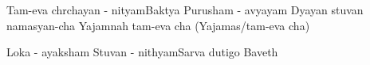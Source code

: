 \documentclass[10pt]{article}
\begin{document}













\slokas
{Tam-eva chrchayan - nityam}{Baktya Purusham - avyayam}
{Dyayan stuvan namasyan-cha} {Yajamnah tam-eva cha (Yajamas/tam-eva cha)}


{Loka - ayaksham Stuvan - nithyam}{Sarva dutigo Baveth}



\end{document}
